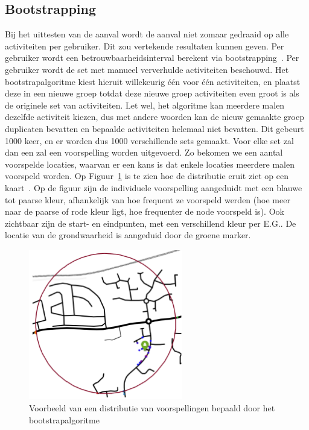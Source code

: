 \subsection{Bootstrapping}
Bij het uittesten van de aanval wordt de aanval niet zomaar gedraaid op alle
activiteiten per gebruiker. Dit zou vertekende resultaten kunnen geven. Per
gebruiker wordt een betrouwbaarheidsinterval berekent via
bootstrapping~\cite{Dhondt, Verdonck_2022}. Per gebruiker wordt de set met
manueel ververhulde activiteiten beschouwd. Het bootstrapalgoritme kiest
hieruit willekeurig één voor één activiteiten, en plaatst deze in een nieuwe
groep totdat deze nieuwe groep activiteiten even groot is als de originele set
van activiteiten. Let wel, het algoritme kan meerdere malen dezelfde activiteit
kiezen, dus met andere woorden kan de nieuw gemaakte groep duplicaten bevatten
en bepaalde activiteiten helemaal niet bevatten. Dit gebeurt 1000 keer, en er
worden dus 1000 verschillende sets gemaakt. Voor elke set zal dan een zal een
voorspelling worden uitgevoerd. Zo bekomen we een aantal voorspelde locaties,
waarvan er een kans is dat enkele locaties meerdere malen voorspeld worden. Op
Figuur~\ref{fig:bootstrapping} is te zien hoe de distributie eruit ziet op een
kaart~\cite{Verdonck_2022}. Op de figuur zijn de individuele voorspelling
aangeduidt met een blauwe tot paarse kleur, afhankelijk van hoe frequent ze
voorspeld werden (hoe meer naar de paarse of rode kleur ligt, hoe frequenter de
node voorspeld is). Ook zichtbaar zijn de start- en eindpunten, met een
verschillend kleur per \ac{E.G.}. De locatie van de grondwaarheid is aangeduid
door de groene marker.

\begin{figure}[h]
    \centering
    \includegraphics[width=0.6\textwidth]{fig/bootstrapping.png}
    \caption{Voorbeeld van een distributie van voorspellingen bepaald door het bootstrapalgoritme~\cite{Verdonck_2022}}\label{fig:bootstrapping}
\end{figure}

